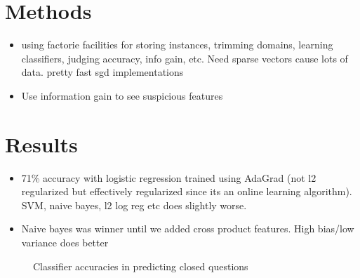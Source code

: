 \documentclass[11pt]{article}
\begin{document}
\section{Methods}
\begin{itemize}
\item using factorie facilities for storing instances, trimming domains, learning classifiers, judging accuracy, info gain, etc. Need sparse vectors cause lots of data. pretty fast sgd implementations
\item Use information gain to see suspicious features
\end{itemize}

\section{Results}
\begin{itemize}
\item 71\% accuracy with logistic regression trained using AdaGrad (not l2 regularized but effectively regularized since its an online learning algorithm). SVM, naive bayes, l2 log reg etc does slightly worse.
\item Naive bayes was winner until we added cross product features. High bias/low variance does better
\end{itemize}

\begin{figure}
\centering
{}
\caption{Classifier accuracies in predicting closed questions}
\label{fig:results}
\end{figure}
\end{document}
